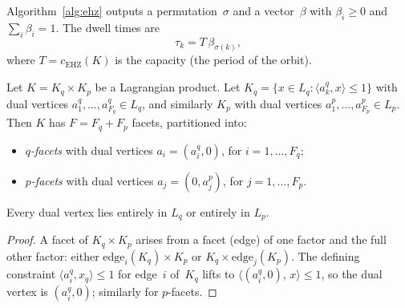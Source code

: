 \begin{remark}\label{rem:beta-to-tau}
Algorithm~\ref{alg:ehz} outputs a permutation~$\sigma$ and
a vector~$\beta$ with $\beta_i \geq 0$ and
$\sum_i \beta_i = 1$.
The dwell times are
\[
  \tau_k = T\, \beta_{\sigma(k)},
\]
where $T = c_{\mathrm{EHZ}}(K)$ is the capacity
(the period of the orbit).
\end{remark}



\begin{unverified}
\begin{lemma}\label{lem:lagrangian-facets}
Let $K = K_q \times K_p$ be a Lagrangian product.
Let $K_q = \{x \in L_q : \langle a_k^q, x \rangle \leq 1\}$
with dual vertices
$a_1^q, \ldots, a_{F_q}^q \in L_q$,
and similarly $K_p$ with dual vertices
$a_1^p, \ldots, a_{F_p}^p \in L_p$.
Then $K$ has $F = F_q + F_p$ facets, partitioned into:
\begin{itemize}
\item \emph{$q$-facets} with dual vertices $a_i = (a_i^q, 0)$,
  for $i = 1, \ldots, F_q$;
\item \emph{$p$-facets} with dual vertices $a_j = (0, a_j^p)$,
  for $j = 1, \ldots, F_p$.
\end{itemize}
Every dual vertex lies entirely in $L_q$ or entirely in $L_p$.
\end{lemma}

\begin{proof}
A facet of $K_q \times K_p$ arises from a facet (edge) of
one factor and the full other factor: either
$\text{edge}_i(K_q) \times K_p$ or $K_q \times \text{edge}_j(K_p)$.
The defining constraint $\langle a_i^q, x_q \rangle \leq 1$
for edge~$i$ of~$K_q$ lifts to
$\langle (a_i^q, 0),\, x \rangle \leq 1$,
so the dual vertex is $(a_i^q, 0)$;
similarly for $p$-facets.
\end{proof}
\end{unverified}


